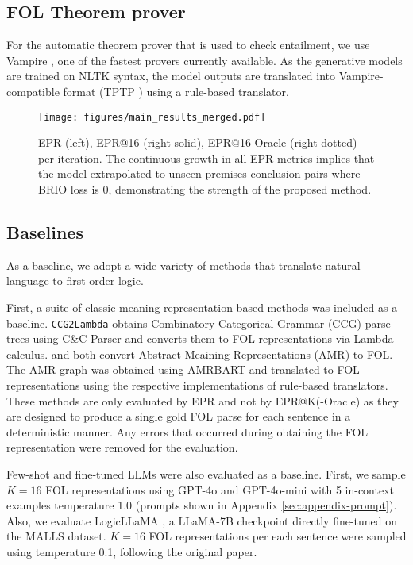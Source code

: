 \subsection{FOL Theorem prover}

For the automatic theorem prover that is used to check entailment, we use Vampire \citep{vampire}, one of the fastest provers currently available. As the generative models are trained on NLTK syntax, the model outputs are translated into Vampire-compatible format (TPTP \citep{tptp}) using a rule-based translator.

\begin{figure*}[t]
    \centering
    \texttt{[image: figures/main\_results\_merged.pdf]}
    \caption{EPR (left), EPR@16 (right-solid), EPR@16-Oracle (right-dotted) per iteration. The continuous growth in all EPR metrics implies that the model extrapolated to unseen premises-conclusion pairs where BRIO loss is 0, demonstrating the strength of the proposed method.}
    \label{fig:main-results}
\end{figure*}

\subsection{Baselines}

As a baseline, we adopt a wide variety of methods that translate natural language to first-order logic.

First, a suite of classic meaning representation-based methods was included as a baseline. \texttt{CCG2Lambda} \citep{ccg2lambda} obtains Combinatory Categorical Grammar (CCG) parse trees using C\&C Parser \citep{cncparser} and converts them to FOL representations via Lambda calculus. \citet{amr2folbos} and \citet{amr2fol} both convert Abstract Meaining Representations (AMR) to FOL. The AMR graph was obtained using AMRBART \citep{amrparser} and translated to FOL representations using the respective implementations of rule-based translators. These methods are only evaluated by EPR and not by EPR@K(-Oracle) as they are designed to produce a single gold FOL parse for each sentence in a deterministic manner. Any errors that occurred during obtaining the FOL representation were removed for the evaluation.

Few-shot and fine-tuned LLMs were also evaluated as a baseline. First, we sample $K=16$ FOL representations using GPT-4o and GPT-4o-mini \citep{gpt4o} with 5 in-context examples temperature 1.0 (prompts shown in Appendix \ref{sec:appendix-prompt}). Also, we evaluate LogicLLaMA \citep{malls}, a LLaMA-7B \citep{llama1} checkpoint directly fine-tuned on the MALLS dataset. $K=16$ FOL representations per each sentence were sampled using temperature 0.1, following the original paper.
